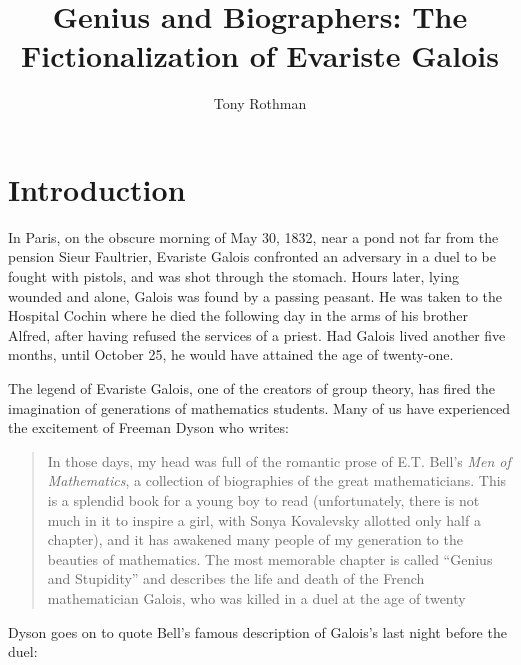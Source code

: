 \documentclass[12pt]{article}
\begin{document}
\title{Genius and Biographers: The Fictionalization of Evariste Galois}
\author{Tony Rothman}
\date{}
\maketitle

\section{Introduction}

In Paris, on the obscure morning of May 30, 1832, near a pond not far from the pension Sieur Faultrier, Evariste Galois confronted an adversary in a duel to be fought with pistols, and was shot through the stomach. Hours later, lying wounded and alone, Galois was found by a passing peasant. He was taken to the Hospital Cochin where he died the following day in the arms of his brother Alfred, after having refused the services of a priest. Had Galois lived another five months, until October 25, he would have attained the age of twenty-one. 

The legend of Evariste Galois, one of the creators of group theory, has fired the imagination of generations of mathematics students. Many of us have experienced the excitement of Freeman Dyson who writes:

\begin{quote}
In those days, my head was full of the romantic prose of E.T. Bell's \emph{Men of Mathematics}, a collection of biographies of the great mathematicians. This is a splendid book for a young boy to read (unfortunately, there is not much in it to inspire a girl, with Sonya Kovalevsky allotted only half a chapter), and it has awakened many people of my generation to the beauties of mathematics. The most memorable chapter is called ``Genius and Stupidity'' and describes the life and death of the French mathematician Galois, who was killed in a duel at the age of twenty \cite{1}
\end{quote}
Dyson goes on to quote Bell's famous description of Galois's last night before the duel:
\end{document}
